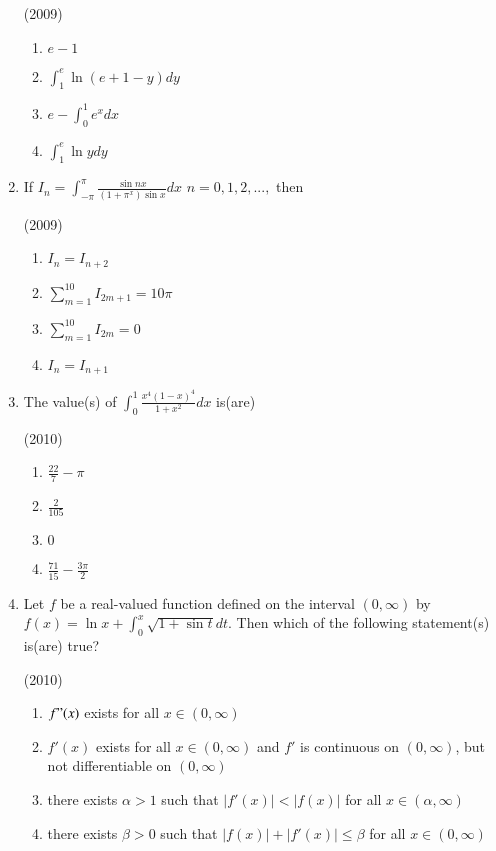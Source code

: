 \documentclass[journal,12pt,twocolumn]{IEEEtran}
\theoremstyle{remark}
\begin{document}
\begin{enumerate}
		\hfill{(2009)}
		\begin{multicols}{2}
		\begin{enumerate}
			\item $e-1$
			\item $\int_{1}^{e}\ln (e+1-y)dy$
			\item $e-\int_{0}^{1}e^xdx$
			\item $\int_{1}^{e}\ln ydy$
		\end{enumerate}
			\end{multicols}
	\item 
		If $I_n=\int_{-\pi}^{\pi}\frac{\sin{nx}}{(1+{\pi}^x)\sin x}dx$ $n=0,1,2, ...,$ then

		\hfill{(2009)}
		\begin{multicols}{2}
		\begin{enumerate}
			\item $I_{n}=I_{n+2}$
			\item $\sum_{m=1}^{10}I_{2m+1}=10\pi$
			\item $\sum_{m=1}^{10}I_{2m}=0$
			\item $I_{n}=I_{n+1}$
		\end{enumerate}
			\end{multicols}
	\item 
		The value(s) of $\int_{0}^{1}\frac{x^4(1-x)^4}{1+x^2}dx$ is(are)

		\hfill{(2010)}
		\begin{multicols}{2}
		\begin{enumerate}
			\item  $\frac{22}{7}-\pi$
			\item $\frac{2}{105}$
			\item $0$
			\item $\frac{71}{15}-\frac{3\pi}{2}$
		\end{enumerate}
			\end{multicols}
	\item 
		Let $f$ be a real-valued function defined on the interval $(0,\infty)$ by $f(x)=\ln x+\int_{0}^{x}\sqrt{1+\sin t}dt$. Then which of the following statement(s) is(are) true?

		\hfill{(2010)}
		\begin{enumerate}
			\item $f"(x)$ exists for all $x\in(0,\infty)$
			\item $f'(x)$ exists for all $x\in(0,\infty)$ and $f'$ is continuous on $(0,\infty)$, but not differentiable on $(0,\infty)$
			\item there exists $\alpha>1$ such that $|f'(x)|<|f(x)|$ for all $x\in(\alpha,\infty)$
			\item there exists $\beta>0$ such that $|f(x)|+|f'(x)|\leq\beta$ for all $x\in(0,\infty)$
		\end{enumerate}







\end{enumerate}
\end{document}
